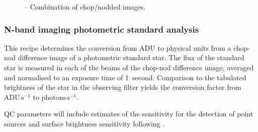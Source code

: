 \begin{figure}[hb]
  \centering
  \caption[Recipe: ]{ --
    Combination of chop/nodded images.}
  \label{fig:metis_n_img_chopnod}
\end{figure}

\clearpage
\subsubsection{N-band imaging photometric standard analysis}
\label{n_img_std_process}

This recipe determines the conversion from ADU to physical units from
a chop-nod difference image of a photometric standard star.  The flux
of the standard star is measured in each of the beams of the chop-nod
difference image, averaged and normalised to an exposure time of
1~second. Comparison to the tabulated brightness of the star in the
observing filter yields the conversion factor from
$\mathrm{ADU}\,\mathrm{s}^{-1}$ to
$\mathrm{photons}\,\mathrm{s}^{-1}$.

QC parameters will include estimates of the sensitivity for the
detection of point sources and surface brightness sensitivity
following \cite{visir_manual}.

